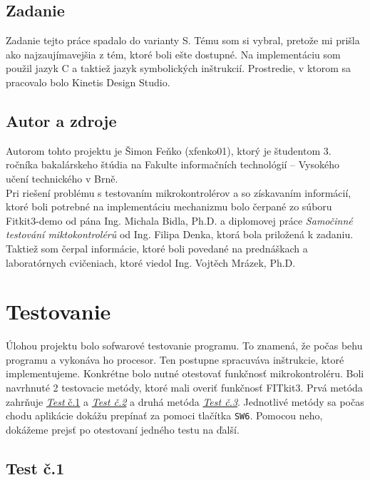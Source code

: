 \documentclass[11pt,a4paper]{article}
\begin{document}
    \subsection{Zadanie}

        \indent Zadanie tejto práce spadalo do varianty S. Tému som si vybral, pretože mi prišla ako najzaujímavejšia z tém, ktoré boli ešte dostupné. Na implementáciu som použil jazyk C a taktiež jazyk symbolických inštrukcií. Prostredie, v ktorom sa pracovalo bolo Kinetis Design Studio.

    \subsection{Autor a zdroje}

        \indent Autorom tohto projektu je Šimon Feňko (xfenko01), ktorý je študentom 3. ročníka bakalárskeho štúdia na Fakulte informačních technológií – Vysokého učení technického v Brně.\textcolor{blue}{\cite{VUT}} \\[0.4em]
        \indent Pri riešení problému s testovaním mikrokontrolérov a so získavaním informácií, ktoré boli potrebné na implementáciu mechanizmu bolo čerpané zo súboru Fitkit3-demo od pána Ing. Michala Bidla, Ph.D. a diplomovej práce \textit{Samočinné testování miktokontrolérů}\textcolor{blue}{\cite{DENK}} od Ing. Filipa Denka, ktorá bola priložená k zadaniu. Taktiež som čerpal informácie, ktoré boli povedané na prednáškach\textcolor{blue}{\cite{IMP}} a laboratórnych cvičeniach, ktoré viedol Ing. Vojtěch Mrázek, Ph.D.


\section{Testovanie}

    \indent Úlohou projektu bolo sofwarové testovanie programu. To znamená, že počas behu programu a vykonáva ho procesor. Ten postupne spracuváva inštrukcie, ktoré implementujeme. Konkrétne bolo nutné otestovať funkčnosť mikrokontroléru. Boli navrhnuté 2 testovacie metódy, ktoré mali overiť funkčnosť FITkit3. Prvá metóda zahrňuje \hyperlink{label}{\textit{Test} č.1} a \hyperlink{label}{\textit{Test č.2}} a druhá metóda \hyperlink{label}{\textit{Test č.3}}. Jednotlivé metódy sa počas chodu aplikácie dokážu prepínať za pomoci tlačítka \texttt{SW6}. Pomocou neho, dokážeme prejsť po otestovaní jedného testu na ďalší.
    
    \subsection{Test č.1}
    
\end{document}
